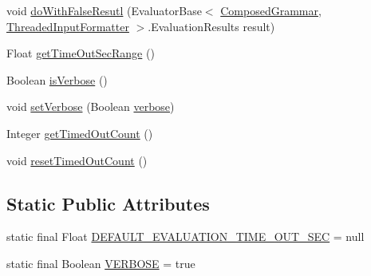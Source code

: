 \begin{DoxyCompactItemize}
\item 
void \hyperlink{classit_1_1emarolab_1_1cagg_1_1core_1_1evaluation_1_1interfacing_1_1TimeOutedEvaluatorBase_abb0740ad1b0b3ae58867e1be55d57e1a}{do\-With\-False\-Resutl} (Evaluator\-Base$<$ \hyperlink{classit_1_1emarolab_1_1cagg_1_1core_1_1evaluation_1_1interfacing_1_1ComposedGrammar}{Composed\-Grammar}, \hyperlink{classit_1_1emarolab_1_1cagg_1_1core_1_1evaluation_1_1inputFormatting_1_1ThreadedInputFormatter}{Threaded\-Input\-Formatter} $>$.Evaluation\-Results result)
\item 
Float \hyperlink{classit_1_1emarolab_1_1cagg_1_1core_1_1evaluation_1_1interfacing_1_1TimeOutedEvaluatorBase_ac30cdad4bf47f20e463093dc2df03a8b}{get\-Time\-Out\-Sec\-Range} ()
\item 
Boolean \hyperlink{classit_1_1emarolab_1_1cagg_1_1core_1_1evaluation_1_1interfacing_1_1TimeOutedEvaluatorBase_aefba9dfd1b29e710d927a6f35da7feea}{is\-Verbose} ()
\item 
void \hyperlink{classit_1_1emarolab_1_1cagg_1_1core_1_1evaluation_1_1interfacing_1_1TimeOutedEvaluatorBase_af945fa309567dd0291707710081b639b}{set\-Verbose} (Boolean \hyperlink{classit_1_1emarolab_1_1cagg_1_1core_1_1evaluation_1_1interfacing_1_1TimeOutedEvaluatorBase_a9001a1905c1aa9ae0b1fbd95551150fc}{verbose})
\item 
Integer \hyperlink{classit_1_1emarolab_1_1cagg_1_1core_1_1evaluation_1_1interfacing_1_1TimeOutedEvaluatorBase_ae89fa93179ad5c34278413555e43427b}{get\-Timed\-Out\-Count} ()
\item 
void \hyperlink{classit_1_1emarolab_1_1cagg_1_1core_1_1evaluation_1_1interfacing_1_1TimeOutedEvaluatorBase_ac0c468b364368495cef4f3ba5933c437}{reset\-Timed\-Out\-Count} ()
\end{DoxyCompactItemize}
\subsection*{Static Public Attributes}
\begin{DoxyCompactItemize}
\item 
static final Float \hyperlink{classit_1_1emarolab_1_1cagg_1_1core_1_1evaluation_1_1interfacing_1_1TimeOutedEvaluatorBase_a37551d22b4de4b5c4759654d2a8b1e0a}{D\-E\-F\-A\-U\-L\-T\-\_\-\-E\-V\-A\-L\-U\-A\-T\-I\-O\-N\-\_\-\-T\-I\-M\-E\-\_\-\-O\-U\-T\-\_\-\-S\-E\-C} = null
\item 
static final Boolean \hyperlink{classit_1_1emarolab_1_1cagg_1_1core_1_1evaluation_1_1interfacing_1_1TimeOutedEvaluatorBase_a156e1c435d95cb605fe940a5b7d39bd0}{V\-E\-R\-B\-O\-S\-E} = true
\end{DoxyCompactItemize}
